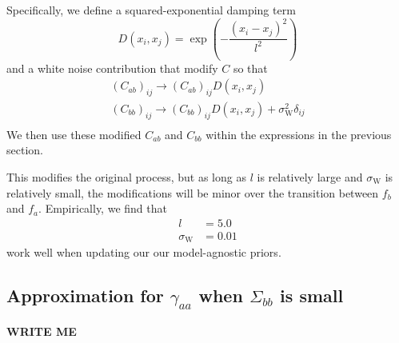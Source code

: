 \documentclass[onecolumn]{article}
\begin{document}
Specifically, we define a squared-exponential damping term
\begin{equation}
    D(x_i, x_j) = \exp\left(-\frac{(x_i - x_j)^2}{l^2}\right)
\end{equation}
and a white noise contribution that modify $C$ so that
\begin{gather}
    (C_{ab})_{ij} \rightarrow (C_{ab})_{ij} D(x_i, x_j) \\
    (C_{bb})_{ij} \rightarrow (C_{bb})_{ij} D(x_i, x_j) + \sigma_\mathrm{W}^2 \delta_{ij} \\
\end{gather}
We then use these modified $C_{ab}$ and $C_{bb}$ within the expressions in the previous section.

This modifies the original process, but as long as $l$ is relatively large and $\sigma_\mathrm{W}$ is relatively small, the modifications will be minor over the transition between $f_b$ and $f_a$.
Empirically, we find that
\begin{align}
    l & = 5.0 \\
    \sigma_\mathrm{W} & = 0.01
\end{align}
work well when updating our our model-agnostic priors.


\subsection*{Approximation for $\gamma_{aa}$ when $\Sigma_{bb}$ is small}

\textbf{WRITE ME}

\end{document}
